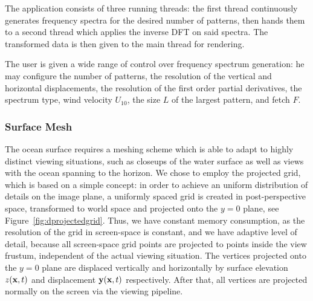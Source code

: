 The application consists of three running threads: the first thread continuously
generates frequency spectra for the desired number of patterns, then hands them
to a second thread which applies the inverse DFT on said spectra. The transformed
data is then given to the main thread for rendering.

The user is given a wide range of control over frequency spectrum generation:
he may configure the number of patterns, the resolution of the vertical and
horizontal displacements, the resolution of the first order partial derivatives,
the spectrum type, wind velocity $U_{10}$, the size $L$ of the largest pattern,
and fetch $F$.

\subsubsection{Surface Mesh}
%
%
The ocean surface requires a meshing scheme which is able to adapt to highly
distinct viewing situations, such as closeups of the water surface as well as
views with the ocean spanning to the horizon. We chose to employ the projected
grid\cite{Hinsinger:2002}\cite{thesis:johanson}, which is based on a simple
concept: in order to achieve an uniform distribution of details on the image
plane, a uniformly spaced grid is created in post-perspective space,
transformed to world space and projected onto the $y=0$ plane, see
Figure~\ref{fig:dprojectedgrid}. Thus, we have
constant memory consumption, as the resolution of the grid in screen-space is
constant, and we have adaptive level of detail, because all screen-space
grid points are projected to points inside the view frustum, independent of the
actual viewing situation. The vertices projected onto the $y=0$ plane are
displaced vertically and horizontally by surface elevation $z(\mathbf{x},t)$
and displacement $\mathbf{y}(\mathbf{x},t)$ respectively. After that, all vertices
are projected normally on the screen via the viewing pipeline.
%
